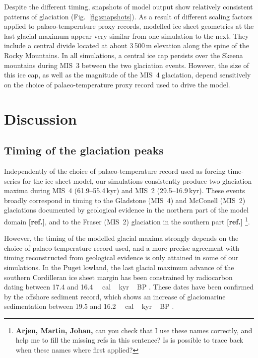\documentclass[tc, manuscript]{copernicus}
\newcommand{\aref}[0]{\textbf{[ref.]}}
\begin{document}
Despite the different timing, snapshots of model output show relatively
consistent patterns of glaciation (Fig.~\ref{fig:snapshots}). As a result of
different scaling factors applied to palaeo-temperature proxy records,
modelled ice sheet geometries at the last glacial maximum appear very similar
from one simulation to the next. They include a central divide located at about
3\,500\,m elevation along the spine of the Rocky Mountains. In all
simulations, a central ice cap persists over the Skeena mountains during MIS~3
between the two glaciation events. However, the size of this ice cap, as well
as the magnitude of the MIS~4 glaciation, depend sensitively on the choice of
palaeo-temperature proxy record used to drive the model.


\section{Discussion}
\label{sec:discussion}

\subsection{Timing of the glaciation peaks}

Independently of the choice of palaeo-temperature record used as forcing
time-series for the ice sheet model, our simulations consistently produce two
glaciation maxima during MIS~4 (61.9--55.4\,kyr) and MIS~2
(29.5--16.9\,kyr). These events broadly correspond in timing to the
Gladstone (MIS~4) and McConell (MIS~2) glaciations documented by geological
evidence in the northern part of the model domain \aref, and to the Fraser
(MIS~2) glaciation in the southern part \aref
\footnote{\textbf{Arjen, Martin, Johan,} can you check that I use these names
    correctly, and help me to fill the missing refs in this sentence? Is is
    possible to trace back when these names where first applied?}.

However, the timing of the modelled glacial maxima strongly depends on the
choice of palaeo-temperature record used, and a more precise agreement with
timing reconstructed from geological evidence is only attained in some of our
simulations. In the Puget lowland, the last glacial maximum advance of the
southern Cordilleran ice sheet margin has been constrained by radiocarbon
dating between 17.4 and 16.4\,\unit{\,cal\,kyr\,BP}
\citep[Fig.~4]{Porter.Swanson.1998}.
These dates have been confirmed by the offshore sediment record, which shows an
increase of glaciomarine sedimentation between 19.5 and
16.2\,\unit{\,cal\,kyr\,BP} \citep{Cosma.etal.2008}.
\end{document}
